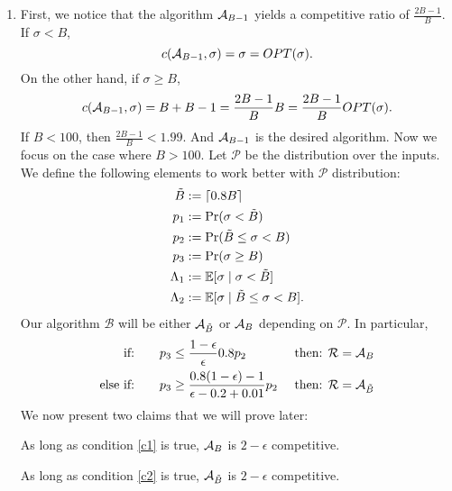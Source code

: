 \documentclass[11pt]{article}
\begin{document}
\begin{enumerate}
    \item First, we notice that the algorithm $\mathcal{A}_{B-1}$ yields a competitive ratio of $\frac{2B-1}{B}$. If $\sigma < B$,
    \begin{equation*}
        c(\mathcal{A}_{B-1}, \sigma) = \sigma = OPT(\sigma).
    \end{equation*}
    On the other hand, if $\sigma \geq B$, 
    \begin{equation*}
        c(\mathcal{A}_{B-1}, \sigma) = B+B-1 = \frac{2B-1}{B}B=\frac{2B-1}{B}OPT(\sigma).
    \end{equation*}
    If $B<100$, then $\frac{2B-1}{B} < 1.99$. And $\mathcal{A}_{B-1}$ is the desired algorithm. Now we focus on the case where $B > 100$. Let $\mathcal P$ be the distribution over the inputs. We define the following elements to work better with $\mathcal{P}$ distribution:
    \begin{align*}
        \tilde B &:= \lceil0.8B \rceil\\
        p_1 &:= \Pr( \sigma <  \tilde B)\\
        p_2 &:= \Pr(\tilde B \leq \sigma <  B)\\
        p_3 &:= \Pr( \sigma \geq B)\\
        \Lambda_1 &:= \mathbb{E}[\sigma \mid \sigma <  \tilde B]\\
        \Lambda_2 &:= \mathbb{E}[\sigma \mid \tilde B \leq \sigma <  B].
    \end{align*}
    Our algorithm $\mathcal {B}$ will be either $\mathcal{A}_{\tilde B}$ or $\mathcal{A}_{B}$ depending on $\mathcal P$. In particular,
    \begin{align}
        \text{if:}&\qquad p_3 \leq \frac{1-\epsilon}{\epsilon} 0.8 p_2 &\text{ then: } \mathcal{R} = \mathcal{A}_{B} \label{c1}\\
        \text{else if:}&\qquad p_3 \geq \frac{0.8(1-\epsilon)-1}{\epsilon- 0.2 + 0.01}p_2 &\text{ then: } \mathcal{R} = \mathcal{A}_{\tilde{B}}\label{c2}
    \end{align} 
    We now present two claims that we will prove later:
    \begin{claim}\label{cl1} As long as condition \ref{c1} is true, $\mathcal{A}_B$ is $2-\epsilon$ competitive.
    \end{claim}
    \begin{claim}\label{cl2} As long as condition \ref{c2} is true, $\mathcal{A}_{\tilde B}$ is $2-\epsilon$ competitive.
    \end{claim}


\end{enumerate}
\end{document}
